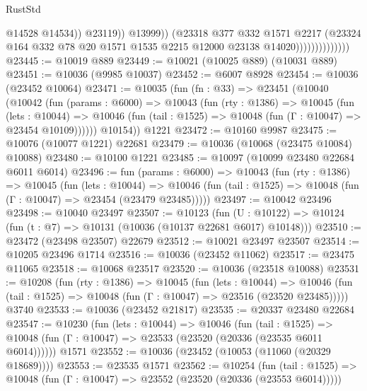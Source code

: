 \begin{lexlean}{RustStd}
\begin{coremodule}
{{                                        @14528
                                        @14534))
                                    @23119))
                                @13999))
                            (@23318
                              @377
                              @332
                              @1571
                              @2217
                              (@23324
                                @164
                                @332
                                @78
                                @20
                                @1571
                                @1535
                                @2215
                                @12000
                                @23138
                                @14020))))))))))))))
@23445 := @10019 @889
@23449 := @10021 (@10025 @889) (@10031 @889)
@23451 := @10036 (@9985 @10037)
@23452 := @6007 @8928
@23454 := @10036 (@23452 @10064)
@23471 := @10035
    (fun (fn : @33) =>
    @23451
      (@10040
        (@10042
          (fun (params : @6000) =>
          @10043
            (fun (rty : @1386) =>
            @10045
              (fun (lets : @10044) =>
              @10046 (fun (tail : @1525) => @10048 (fun (Γ : @10047) => @23454 @10109))))))
        @10154))
    @1221
@23472 := @10160 @9987
@23475 := @10076 (@10077 @1221) @22681
@23479 := @10036 (@10068 (@23475 @10084) @10088)
@23480 := @10100 @1221
@23485 := @10097 (@10099 @23480 @22684 @6011 @6014)
@23496 := fun (params : @6000) =>
  @10043
    (fun (rty : @1386) =>
    @10045
      (fun (lets : @10044) =>
      @10046 (fun (tail : @1525) => @10048 (fun (Γ : @10047) => @23454 (@23479 @23485)))))
@23497 := @10042 @23496
@23498 := @10040 @23497
@23507 := @10123
    (fun (U : @10122) => @10124 (fun (t : @7) => @10131 (@10036 (@10137 @22681 @6017) @10148)))
@23510 := @23472 (@23498 @23507) @22679
@23512 := @10021 @23497 @23507
@23514 := @10205 @23496 @1714
@23516 := @10036 (@23452 @11062)
@23517 := @23475 @11065
@23518 := @10068 @23517
@23520 := @10036 (@23518 @10088)
@23531 := @10208
    (fun (rty : @1386) =>
    @10045
      (fun (lets : @10044) =>
      @10046 (fun (tail : @1525) => @10048 (fun (Γ : @10047) => @23516 (@23520 @23485)))))
    @3740
@23533 := @10036 (@23452 @21817)
@23535 := @20337 @23480 @22684
@23547 := @10230
    (fun (lets : @10044) =>
    @10046
      (fun (tail : @1525) =>
      @10048 (fun (Γ : @10047) => @23533 (@23520 (@20336 (@23535 @6011 @6014))))))
    @1571
@23552 := @10036 (@23452 (@10053 (@11060 (@20329 @18689))))
@23553 := @23535 @1571
@23562 := @10254
    (fun (tail : @1525) => @10048 (fun (Γ : @10047) => @23552 (@23520 (@20336 (@23553 @6014)))))
}}
\end{coremodule}
\end{lexlean}
